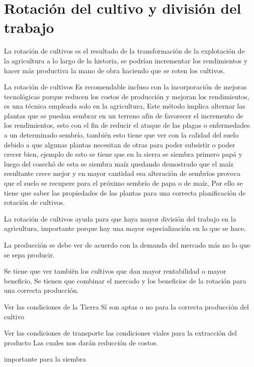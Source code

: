 \documentclass[
  a4paper,
]{article}
\begin{document}
\hypertarget{rotaciuxf3n-del-cultivo-y-divisiuxf3n-del-trabajo}{%
\section{Rotación del cultivo y división del
trabajo}\label{rotaciuxf3n-del-cultivo-y-divisiuxf3n-del-trabajo}}

La rotación de cultivos es el resultado de la transformación de la
explotación de la agricultura a lo largo de la historia, se podrían
incrementar los rendimientos y hacer más productiva la mano de obra
haciendo que se roten los cultivos.

La rotación de cultivos Es recomendable incluso con la incorporación de
mejoras tecnológicas porque reducen los costos de producción y mejoran
los rendimientos, es una técnica empleada solo en la agricultura, Este
método implica alternar las plantas que se puedan sembrar en un terreno
afín de favorecer el incremento de los rendimientos, esto con el fin de
reducir el ataque de las plagas o enfermedades a un determinado sembrío,
también esto tiene que ver con la calidad del suelo debido a que algunas
plantas necesitan de otras para poder subsistir o poder crecer bien,
ejemplo de esto se tiene que en la sierra se siembra primero papá y
luego del cosechó de esta se siembra maíz quedando demostrado que el
maíz resultante crece mejor y en mayor cantidad esa alteración de
sembríos provoca que el suelo se recupere para el próximo sembrío de
papa o de maíz, Por ello se tiene que saber las propiedades de las
plantas para una correcta planificación de rotación de cultivos.

La rotación de cultivos ayuda para que haya mayor división del trabajo
en la agricultura, importante porque hay una mayor especialización en lo
que se hace.

La producción se debe ver de acuerdo con la demanda del mercado más no
lo que se sepa producir.

Se tiene que ver también los cultivos que dan mayor rentabilidad o mayor
beneficio, Se tienen que combinar el mercado y los beneficios de la
rotación para una correcta producción.

Ver las condiciones de la Tierra Sí son aptas o no para la correcta
producción del cultivo

Ver las condiciones de transporte las condiciones viales para la
extracción del producto Las cuales nos darán reducción de costos.

importante para la siembra
\end{document}
